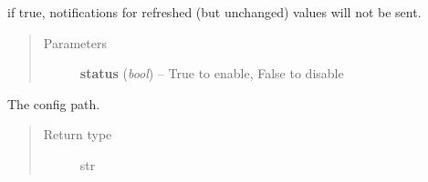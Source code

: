 \documentclass[letterpaper,10pt,english]{sphinxmanual}
\begin{document}
\begin{fulllineitems}
\begin{fulllineitems}
\begin{quote}
\begin{description}
\end{description}\end{quote}

\end{fulllineitems}


\begin{fulllineitems}
\label{option:openzwave.option.ZWaveOption.set_suppress_value_refresh}
if true, notifications for refreshed (but unchanged) values will not be sent.
\begin{quote}\begin{description}
\item[{Parameters}] \leavevmode
\textbf{status} (\emph{bool}) -- True to enable, False to disable

\end{description}\end{quote}

\end{fulllineitems}


\begin{fulllineitems}
\label{option:openzwave.option.ZWaveOption.user_path}
The config path.
\begin{quote}\begin{description}
\item[{Return type}] \leavevmode
str

\end{description}\end{quote}

\end{fulllineitems}


\end{fulllineitems}
\end{document}
